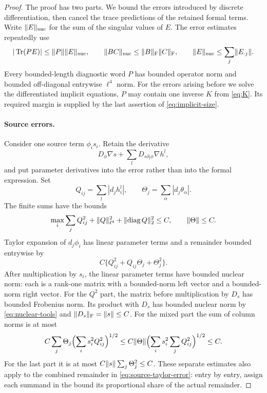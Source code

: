 \begin{proof}
The proof has two parts. We bound the errors introduced by discrete
differentiation, then cancel the trace predictions of the retained formal
terms. Write $\lVert E\rVert_{\rm nuc}$ for the sum of the singular values of
$E$. The error estimates repeatedly use
\begin{equation}
 |\operatorname{Tr}(PE)|\leq\lVert P\rVert\lVert E\rVert_{\rm nuc},\qquad
 \lVert BC\rVert_{\rm nuc}\leq\lVert B\rVert_{\mathrm F}\lVert C\rVert_{\mathrm F},\qquad
 \lVert E\rVert_{\rm nuc}\leq\sum_j\lVert E_{\cdot j}\rVert.
 \label{eq:nuclear-tools}
\end{equation}
Every bounded-length diagnostic word $P$ has bounded operator norm and
bounded off-diagonal entrywise $\ell^4$ norm. For the errors arising before
we solve the differentiated implicit
equations, $P$ may contain one inverse $K$ from \eqref{eq:K}. Its required
margin is supplied by the last assertion of \eqref{eq:implicit-size}.

\paragraph{Source errors.}
Consider one source term $\phi_i s_i$.  Retain the derivative
\begin{equation}
 D_\phi\nabla s+\sum_lD_{s\partial_l\phi}\nabla h^l,
 \label{eq:retained-source}
\end{equation}
and put parameter derivatives into the error rather than into the formal
expression. Set
\[
 Q_{ij}=\sum_l|d_jh_i^l|,\qquad
 \Theta_j=\sum_\alpha|d_j\theta_\alpha|.
\]
The finite sums have the bounds
\[
 \max_i\sum_jQ_{ij}^2+\lVert Q\rVert_{\ell^4}^2
       +\lVert \operatorname{diag} Q\rVert_2^2\leq C,
 \qquad \lVert \Theta\rVert\leq C.
\]
Taylor expansion of $d_j\phi_i$ has linear parameter terms and a remainder
bounded entrywise by
\begin{equation}
 C\{Q_{ij}^2+Q_{ij}\Theta_j+\Theta_j^2\}.
 \label{eq:source-taylor-error}
\end{equation}
After multiplication by $s_i$, the linear parameter terms have bounded
nuclear norm: each is a rank-one matrix with a bounded-norm left vector
and a bounded-norm right vector.  For the $Q^2$ part, the matrix before
multiplication by $D_s$ has bounded Frobenius norm.  Its product with
$D_s$ has bounded nuclear norm by \eqref{eq:nuclear-tools} and
$\lVert D_s\rVert_{\mathrm F}=\lVert s\rVert\leq C$.
For the mixed part the sum of column norms is at most
\[
 C\sum_j\Theta_j\Bigl(\sum_i s_i^2Q_{ij}^2\Bigr)^{1/2}
 \leq C\lVert \Theta\rVert
       \Bigl(\sum_i s_i^2\sum_jQ_{ij}^2\Bigr)^{1/2}\leq C.
\]
For the last part it is at most $C\lVert s\rVert\sum_j\Theta_j^2\leq C$.
These separate estimates also apply to the combined remainder in
\eqref{eq:source-taylor-error}: entry by entry, assign each summand in
the bound its proportional share of the actual remainder.


\end{proof}
